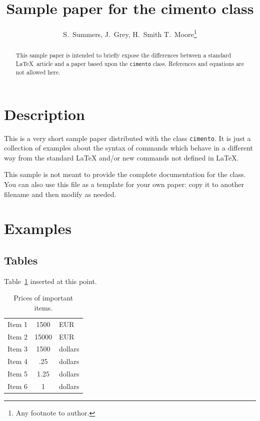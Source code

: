 \documentclass[nocopyright]{cimento}
\title{Sample paper for the cimento class}
\author{S.~Summers\from{ins:x}\ETC,
J.~Grey\from{ins:x},
H.~Smith\from{ins:x}
        \atque
T.~Moore\from{ins:y}\thanks{Any footnote to author.}}
\begin{document}
\maketitle

\begin{abstract}
This sample paper is intended to briefly expose the differences
between a standard \LaTeX\ article and a paper based upon the
\texttt{cimento} class. References and equations are not allowed here. 
\end{abstract}

\section{Description}
This is a very short sample paper distributed with the class
\texttt{cimento}.
It is just a collection of examples about the syntax of commands
which behave in a different way from the standard \LaTeX
and/or new commands not defined in \LaTeX.




This sample is not meant to provide the complete documentation for the class.
You can also use this file as a template for your own paper:
copy it to another filename and then modify as needed.

\section{Examples}

\subsection{Tables}
Table~\ref{tab:pricesI}
inserted at this point.

\begin{table}[h]
  \caption{Prices of important items.}
  \label{tab:pricesI}
  \begin{tabular}{rcl}
    \hline
      Item 1      & 1500  & EUR    \\
      Item 2 & 15000 & EUR    \\
      Item 3      & 1500  & dollars \\
    \hline
      Item 4     & .25   & dollars \\
      Item 5         & 1.25  & dollars \\
      Item 6         & 1     & dollars \\
    \hline
  \end{tabular}
\end{table}
\end{document}
